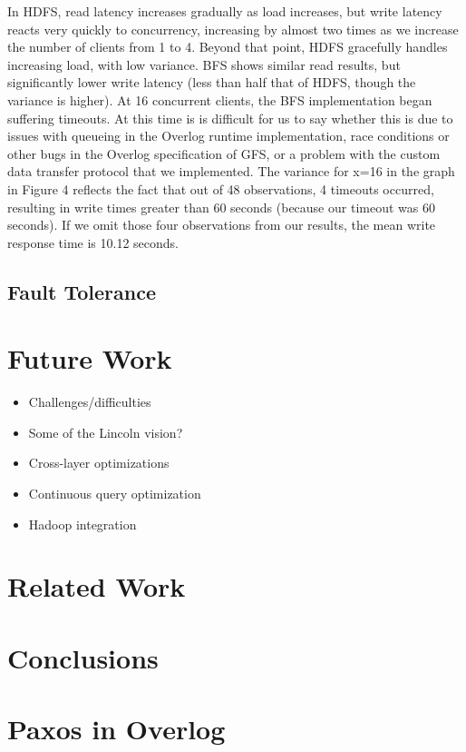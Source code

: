 \documentclass{article}
\begin{document}
In HDFS, read latency increases gradually as load increases, but write latency reacts very quickly to concurrency, increasing by almost two times as we increase the number of clients from 1 to 4.  Beyond that point, HDFS gracefully handles increasing load, with low variance.  BFS shows similar read results, but significantly lower write latency (less than half that of HDFS, though the variance is higher).  At 16 concurrent clients, the BFS implementation began suffering timeouts.  At this time is is difficult for us to say whether this is due to issues with queueing in the Overlog runtime implementation, race conditions or other bugs in the Overlog  specification of GFS, or a problem with the custom data transfer protocol that we implemented.  The variance for x=16 in the graph in Figure 4 reflects the fact that out of 48 observations, 4 timeouts occurred, resulting in write times greater than 60 seconds (because our timeout was 60 seconds).  If we omit those four observations from our results, the mean write response time is 10.12 seconds.

\subsection{Fault Tolerance}



\section{Future Work}
\begin{itemize}
\item
  Challenges/difficulties

\item
  Some of the Lincoln vision?

\item
  Cross-layer optimizations

\item
  Continuous query optimization

\item
  Hadoop integration
\end{itemize}

\section{Related Work}

\section{Conclusions}



\appendix
\section{Paxos in Overlog}
\end{document}
